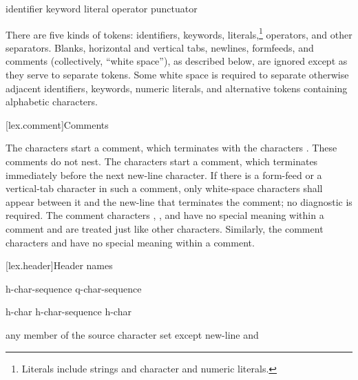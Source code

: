 %
\begin{bnf}
\br
    identifier\br
    keyword\br
    literal\br
    operator\br
    punctuator
\end{bnf}

\pnum
{}%
There are five kinds of tokens: identifiers, keywords, literals,\footnote{Literals include strings and character and numeric literals.
}
operators, and other separators.
%
Blanks, horizontal and vertical tabs, newlines, formfeeds, and comments
(collectively, ``white space''), as described below, are ignored except
as they serve to separate tokens. \enternote Some white space is
required to separate otherwise adjacent identifiers, keywords, numeric
literals, and alternative tokens containing alphabetic characters.
\exitnote%

[lex.comment]{Comments}

\pnum
{}%
%
%
The characters \tcode{/*} start a comment, which terminates with the
characters \tcode{*/}. These comments do not nest.
%
The characters \tcode{//} start a comment, which terminates immediately before the
next new-line character. If there is a form-feed or a vertical-tab
character in such a comment, only white-space characters shall appear
between it and the new-line that terminates the comment; no diagnostic
is required. \enternote The comment characters \tcode{//}, \tcode{/*},
and \tcode{*/} have no special meaning within a \tcode{//} comment and
are treated just like other characters. Similarly, the comment
characters \tcode{//} and \tcode{/*} have no special meaning within a
\tcode{/*} comment. \exitnote%

[lex.header]{Header names}

%
\begin{bnf}
\br
    \terminal{<} h-char-sequence \terminal{>}\br
     q-char-sequence 
\end{bnf}

\begin{bnf}
\br
    h-char\br
    h-char-sequence h-char
\end{bnf}

\begin{bnf}
\br
    \textnormal{any member of the source character set except new-line and \terminal{>}}
\end{bnf}

